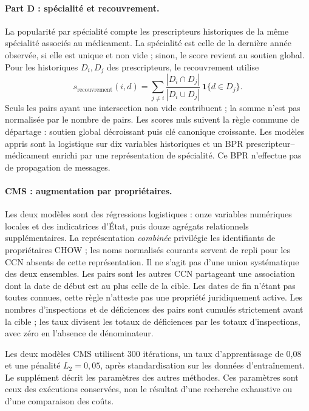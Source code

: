 \paragraph{Part D : spécialité et recouvrement.} La popularité par spécialité compte les prescripteurs historiques de la même spécialité associés au médicament. La spécialité est celle de la dernière année observée, si elle est unique et non vide ; sinon, le score revient au soutien global. Pour les historiques $D_i,D_j$ des prescripteurs, le recouvrement utilise
\begin{equation}
 s_{\mathrm{recouvrement}}(i,d)=\sum_{j\ne i}\frac{|D_i\cap D_j|}{|D_i\cup D_j|}\,\mathbf{1}\{d\in D_j\}.
\end{equation}
Seuls les pairs ayant une intersection non vide contribuent ; la somme n'est pas normalisée par le nombre de pairs. Les scores nuls suivent la règle commune de départage : soutien global décroissant puis clé canonique croissante. Les modèles appris sont la logistique sur dix variables historiques et un BPR prescripteur--médicament enrichi par une représentation de spécialité. Ce BPR n'effectue pas de propagation de messages\cite{hgbcode,hgbpartd}.

\paragraph{CMS : augmentation par propriétaires.} Les deux modèles sont des régressions logistiques : onze variables numériques locales et des indicatrices d'État, puis douze agrégats relationnels supplémentaires. La représentation \emph{combinée} privilégie les identifiants de propriétaires CHOW ; les noms normalisés courants servent de repli pour les CCN absents de cette représentation. Il ne s'agit pas d'une union systématique des deux ensembles. Les pairs sont les autres CCN partageant une association dont la date de début est au plus celle de la cible. Les dates de fin n'étant pas toutes connues, cette règle n'atteste pas une propriété juridiquement active. Les nombres d'inspections et de déficiences des pairs sont cumulés strictement avant la cible ; les taux divisent les totaux de déficiences par les totaux d'inspections, avec zéro en l'absence de dénominateur\cite{hgbcode}.

Les deux modèles CMS utilisent 300 itérations, un taux d'apprentissage de 0,08 et une pénalité $L_2=0,05$, après standardisation sur les données d'entraînement. Le supplément décrit les paramètres des autres méthodes. Ces paramètres sont ceux des exécutions conservées, non le résultat d'une recherche exhaustive ou d'une comparaison des coûts.

